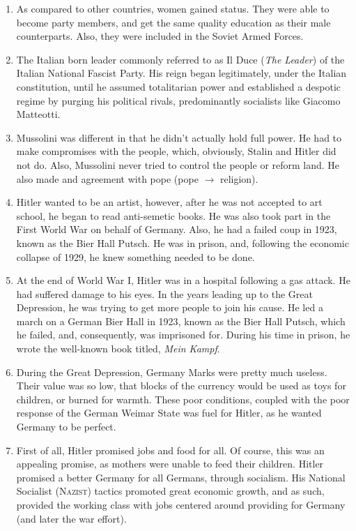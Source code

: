 \documentclass[12pt]{article}
\begin{document}
\begin{flushleft}
\begin{enumerate}
\item As compared to other countries, women gained status. They were able to become party members, and get the same quality education as their male counterparts. Also, they were included in the Soviet Armed Forces.    

\item The Italian born leader commonly referred to as Il Duce (\textit{The Leader}) of the Italian National Fascist Party. His reign began legitimately, under the Italian constitution, until he assumed totalitarian power and established a despotic regime by purging his political rivals, predominantly socialists like Giacomo Matteotti.

\item Mussolini was different in that he didn't actually hold full power. He had to make compromises with the people, which, obviously, Stalin and Hitler did not do. Also, Mussolini never tried to control the people or reform land. He also made and agreement with pope (pope $\longrightarrow$ religion).

\item Hitler wanted to be an artist, however, after he was not accepted to art school, he began to read anti-semetic books. He was also took part in the First World War on behalf of Germany. Also, he had a failed coup in 1923, known as the Bier Hall Putsch. He was in prison, and, following the economic collapse of 1929, he knew something needed to be done.

\item At the end of World War I, Hitler was in a hospital following a gas attack. He had suffered damage to his eyes. In the years leading up to the Great Depression, he was trying to get more people to join his cause. He led a march on a German Bier Hall in 1923, known as the Bier Hall Putsch, which he failed, and, consequently, was imprisoned for. During his time in prison, he wrote the well-known book titled, \textit{Mein Kampf}.

\item During the Great Depression, Germany Marks were pretty much useless. Their value was so low, that blocks of the currency would be used as toys for children, or burned for warmth. These poor conditions, coupled with the poor response of the German Weimar State was fuel for Hitler, as he wanted Germany to be perfect.

\item First of all, Hitler promised jobs and food for all. Of course, this was an appealing promise, as mothers were unable to feed their children. Hitler promised a better Germany for all Germans, through socialism. His National Socialist (\textsc{Nazist}) tactics promoted great economic growth, and as such, provided the working class with jobs centered around providing for Germany (and later the war effort).


\end{enumerate}
\end{flushleft}
\end{document}
